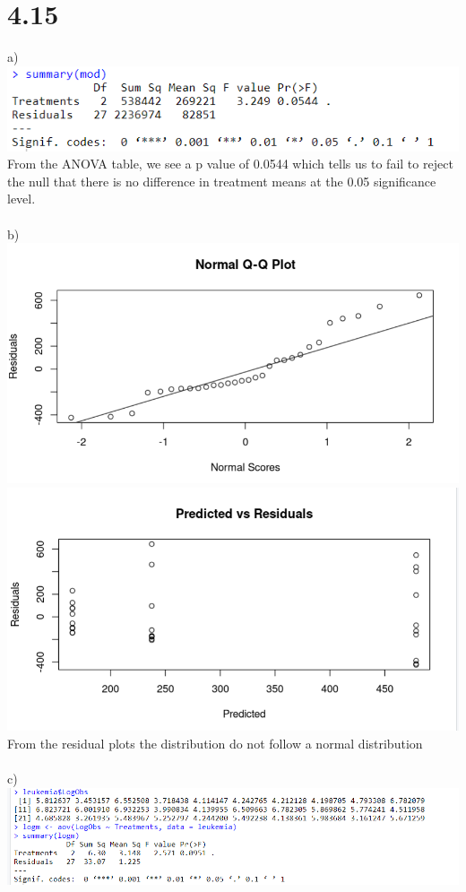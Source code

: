 \documentclass{article}
\begin{document}
\section*{4.15}
a)
\\\includegraphics{4.15a.PNG}
\\From the ANOVA table, we see a p value of 0.0544 which tells us to fail to reject the null that there is no difference in treatment means at the 0.05 significance level.
\\
\\b)
\\\includegraphics{4.15bQQ.PNG}
\\\includegraphics{4.15bRes.PNG}
\\From the residual plots the distribution do not follow a normal distribution
\\
\\c)
\\\includegraphics{4.15c.PNG}
\end{document}
